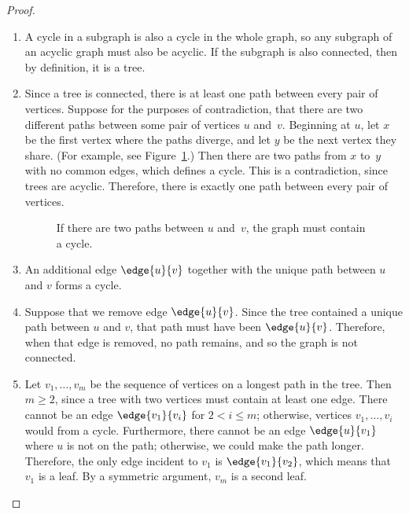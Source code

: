 \begin{proof}
\begin{enumerate}

\item A cycle in a subgraph is also a cycle in the whole graph, so any
  subgraph of an acyclic graph must also be acyclic.  If the subgraph
  is also connected, then by definition, it is a tree.

\item Since a tree is connected, there is at least one path between
  every pair of vertices.  Suppose for the purposes of contradiction,
  that there are two different paths between some pair of vertices
  $u$ and~$v$.  Beginning at $u$, let $x$ be the first vertex where
  the paths diverge, and let $y$ be the next vertex they share.  (For
  example, see Figure~\ref{fig:5L}.)  Then there are two paths from
  $x$ to~$y$ with no common edges, which defines a cycle.  This is a
  contradiction, since trees are acyclic.  Therefore, there is
  exactly one path between every pair of vertices.

\begin{figure}


\caption{If there are two paths between $u$ and~$v$, the graph must
  contain a cycle.}

\label{fig:5L}
\end{figure}

\item An additional edge $\edge{u}{v}$ together with the unique path
  between $u$ and $v$ forms a cycle.

\item Suppose that we remove edge $\edge{u}{v}$.  Since the tree
  contained a unique path between $u$ and $v$, that path must have
  been $\edge{u}{v}$.  Therefore, when that edge is removed, no path
  remains, and so the graph is not connected.

\item Let $v_1, \dots, v_m$ be the sequence of vertices on a longest
  path in the tree.  Then $m \geq 2$, since a tree with two vertices
  must contain at least one edge.  There cannot be an edge
  $\edge{v_1}{v_i}$ for $2 < i \leq m$; otherwise, vertices $v_1,
  \dots, v_i$ would from a cycle.  Furthermore, there cannot be
  an edge $\edge{u}{v_1}$ where $u$ is not on the path; otherwise, we
  could make the path longer.  Therefore, the only edge incident to
  $v_1$ is $\edge{v_1}{v_2}$, which means that $v_1$ is a leaf.  By a
  symmetric argument, $v_m$ is a second leaf.


\end{enumerate}
\end{proof}
